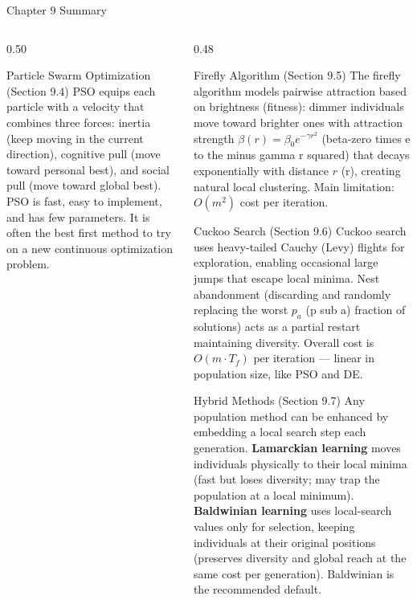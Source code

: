 \documentclass[aspectratio=169,10pt]{beamer}
\begin{document}
\begin{frame}[allowframebreaks]{Chapter 9 Summary}
\begin{columns}[T]
\begin{column}{0.50\textwidth}
      \begin{block}{Particle Swarm Optimization (Section 9.4)}
        PSO equips each particle with a velocity that combines
        three forces: inertia (keep moving in the current direction),
        cognitive pull (move toward personal best), and social pull
        (move toward global best).  PSO is fast, easy to implement,
        and has few parameters.  It is often the best first method
        to try on a new continuous optimization problem.
      \end{block}
    \end{column}
    \begin{column}{0.48\textwidth}
      \begin{block}{Firefly Algorithm (Section 9.5)}
        The firefly algorithm models pairwise attraction based on
        brightness (fitness): dimmer individuals move toward brighter
        ones with attraction strength $\beta(r) = \beta_0 e^{-\gamma
        r^2}$ (beta-zero times e to the minus gamma r squared)
        that decays exponentially with distance $r$ (r), creating
        natural local clustering.  Main limitation: $O(m^2)$ cost
        per iteration.
      \end{block}

      \begin{block}{Cuckoo Search (Section 9.6)}
        Cuckoo search uses heavy-tailed Cauchy (Levy) flights for
        exploration, enabling occasional large jumps that escape
        local minima.  Nest abandonment (discarding and randomly
        replacing the worst $p_a$ (p sub a) fraction of solutions)
        acts as a partial restart maintaining diversity.  Overall
        cost is $O(m \cdot T_f)$ per iteration --- linear in
        population size, like PSO and DE.
      \end{block}

      \begin{block}{Hybrid Methods (Section 9.7)}
        Any population method can be enhanced by embedding a local
        search step each generation.  \textbf{Lamarckian learning}
        moves individuals physically to their local minima (fast but
        loses diversity; may trap the population at a local minimum).
        \textbf{Baldwinian learning} uses local-search values only
        for selection, keeping individuals at their original positions
        (preserves diversity and global reach at the same cost per
        generation).  Baldwinian is the recommended default.
      \end{block}
    \end{column}
  \end{columns}

\end{frame}
\end{document}
